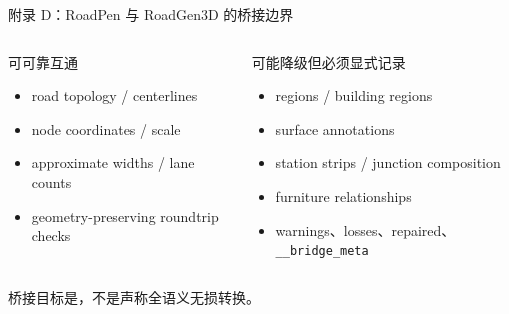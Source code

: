 \documentclass[aspectratio=169,10pt]{ctexbeamer}
\begin{document}
\begin{frame}{附录 D：RoadPen 与 RoadGen3D 的桥接边界}
  \begin{columns}[T,onlytextwidth]
      \begin{block}{可可靠互通}
        \begin{itemize}
          \item road topology / centerlines
          \item node coordinates / scale
          \item approximate widths / lane counts
          \item geometry-preserving roundtrip checks
        \end{itemize}
      \end{block}
      \begin{exampleblock}{可能降级但必须显式记录}
        \begin{itemize}
          \item regions / building regions
          \item surface annotations
          \item station strips / junction composition
          \item furniture relationships
          \item warnings、losses、repaired、\texttt{\_\_bridge\_meta}
        \end{itemize}
      \end{exampleblock}
  \end{columns}
  \deckgap
  \begin{callout}[原则]
    桥接目标是，不是声称全语义无损转换。
  \end{callout}
\end{frame}
\end{document}

